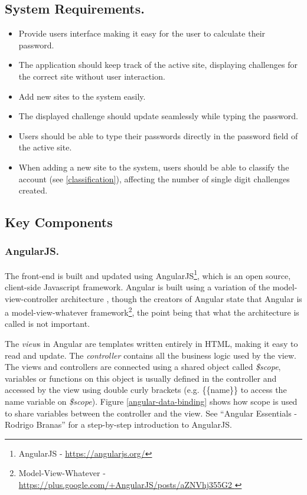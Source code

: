 \subsection{System Requirements.}
\begin{itemize}
    \item Provide users interface making it easy for the user to calculate their password.
    \item The application should keep track of the active site, displaying challenges for the correct site without user interaction.
    \item Add new sites to the system easily. 
    \item The displayed challenge should update seamlessly while typing the password.
    \item Users should be able to type their passwords directly in the password field of the active site.
    \item When adding a new site to the system, users should be able to classify the account (see \autoref{classification}), affecting the number of single digit challenges created.
\end{itemize}



\subsection{Key Components}

\subsubsection{AngularJS.} The front-end is built and updated using AngularJS\footnote{AngularJS - \url{https://angularjs.org/}}, which is an open source, client-side Javascript framework. Angular is built using a variation of the model-view-controller architecture \cite{mvc}, though the creators of Angular state that Angular is a model-view-whatever framework\footnote{Model-View-Whatever - \url{ https://plus.google.com/+AngularJS/posts/aZNVhj355G2 }}, the point being that what the architecture is called is not important. 
\par The \emph{view}s in Angular are templates written entirely in HTML, making it easy to read and update. The \emph{controller} contains all the business logic used by the view. The views and controllers are connected using a shared object called \emph{\$scope}, variables or functions on this object is usually defined in the controller and accessed by the view using double curly brackets (e.g. \{\{name\}\} to access the name variable on \emph{\$scope}). Figure \ref{angular-data-binding} shows how scope is used to share variables between the controller and the view. 
See ``Angular Essentials - Rodrigo Branas''\cite{angularjs-book} for a step-by-step introduction to AngularJS.

